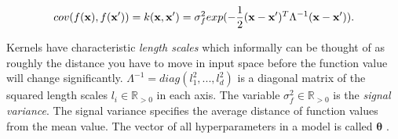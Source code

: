 \documentclass[12pt,a4paper]{report}
\theoremstyle{definition}
\begin{document}
\begin{equation}
	\centering
	cov(f(\textbf{x}), f(\textbf{x}')) = k(\textbf{x}, \textbf{x}') = \sigma_{f}^2 exp(-\frac{1}{2} (\textbf{x} - \textbf{x}')^T \Lambda^{-1} (\textbf{x} - \textbf{x}')).
	\label{eq:SquaredExponentialKernel}
\end{equation}

Kernels have characteristic \emph{length scales} which informally can be thought of as roughly the distance you have to move in input space before the function value will change significantly. 
$\Lambda^{-1}  = diag(l_{1}^2, ... , l_{d}^2)$ is a diagonal matrix of the squared length scales $l_{i} \in \mathbb{R}_{>0}$ in each axis.
The variable $\sigma_{f}^2 \in \mathbb{R}_{>0}$ is the \emph{signal variance}.
The signal variance specifies the average distance of function values from the mean value.
The vector of all hyperparameters in a model is called $\boldsymbol{\theta}$ \citep{RasmussenWilliams2006}. 
\end{document}

